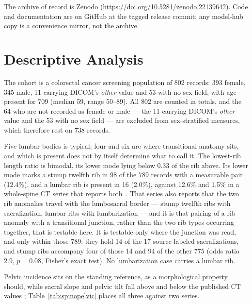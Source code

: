 \documentclass[aapm,mph,amsmath,amssymb,preprint,linenumbers]{revtex4-2}
\newcommand{\datasetdoi}{10.5281/zenodo.22139642}
\newcommand{\doiurl}[1]{\url{https://doi.org/#1}}
\begin{document}
The archive of record is Zenodo (\doiurl{\datasetdoi}). Code and documentation are on GitHub at
the tagged release commit; any model-hub copy is a convenience mirror, not the archive.

\section{Descriptive Analysis}
\label{sec:descriptive}


The cohort is a colorectal cancer screening population of 802 records: 393 female, 345 male,
11 carrying DICOM's \emph{other} value and 53 with no sex field, with age present for 709
(median 59, range 50--89). All 802 are counted in totals, and the 64 who are not recorded as female or male --- the 11
carrying DICOM's \emph{other} value and the 53 with no sex field --- are excluded from
sex-stratified measures, which therefore rest on 738 records.

Five lumbar bodies is typical; four and six are where transitional anatomy sits, and which is
present does not by itself determine what to call it. The lowest-rib length ratio is bimodal,
its lower mode lying below 0.33 of the rib above. Its lower mode marks a stump twelfth rib in 98 of the 789 records with a measurable pair
(12.4\%), and a lumbar rib is present in 16 (2.0\%), against 12.6\% and 1.5\% in a
whole-spine CT series that reports both~\cite{nagata2025}. That series also reports that the two rib anomalies travel with the
lumbosacral border --- stump twelfth ribs with sacralization, lumbar ribs with lumbarization
--- and it is that pairing of a rib anomaly with a transitional junction, rather than the two
rib types occurring together, that is testable here. It is testable only where the junction
was read, and only within those 789: they hold 14 of the 17 source-labeled sacralizations, and stump ribs accompany four of those 14 and 94 of the other 775 (odds ratio 2.9, $p=0.08$, Fisher's exact test). No lumbarization case carries a lumbar rib.

Pelvic incidence sits on the standing reference, as a morphological property should, while
sacral slope and pelvic tilt fall above and below the published CT values
; Table~\ref{tab:spinopelvic} places all three against two
series.
\end{document}
